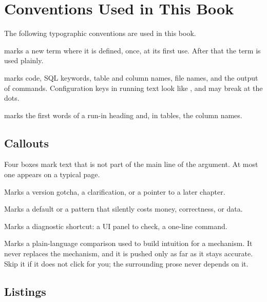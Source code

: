 \chapter{Conventions Used in This Book}
\label{ch:conventions}

The following typographic conventions are used in this book.

\begin{description}[leftmargin=0pt, labelindent=0pt, itemsep=4pt]
  \item[\emph{Italic}] marks a new term where it is defined, once, at its first
  use. After that the term is used plainly.
  \item[\texttt{Monospace}] marks code, SQL keywords, table and column names, file
  names, and the output of commands. Configuration keys in running text look like
  , and may break at the dots.
  \item[\textbf{Bold}] marks the first words of a run-in heading and, in tables, the
  column names.
\end{description}

\section*{Callouts}

Four boxes mark text that is not part of the main line of the argument. At most
one appears on a typical page.

\begin{note}
Marks a version gotcha, a clarification, or a pointer to a later chapter.
\end{note}

\begin{warning}
Marks a default or a pattern that silently costs money, correctness, or data.
\end{warning}

\begin{tip}
Marks a diagnostic shortcut: a UI panel to check, a one-line command.
\end{tip}

\begin{analogy}
Marks a plain-language comparison used to build intuition for a mechanism. It
never replaces the mechanism, and it is pushed only as far as it stays accurate.
Skip it if it does not click for you; the surrounding prose never depends on it.
\end{analogy}

\section*{Listings}

